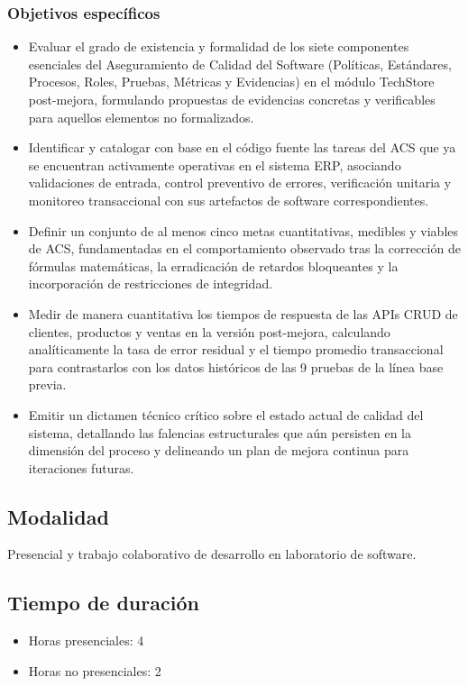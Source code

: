\documentclass{article}
\begin{document}
\subsubsection{Objetivos específicos}
\begin{itemize}
    \item Evaluar el grado de existencia y formalidad de los siete componentes esenciales del Aseguramiento de Calidad del Software (Políticas, Estándares, Procesos, Roles, Pruebas, Métricas y Evidencias) en el módulo TechStore post-mejora, formulando propuestas de evidencias concretas y verificables para aquellos elementos no formalizados.
    \item Identificar y catalogar con base en el código fuente las tareas del ACS que ya se encuentran activamente operativas en el sistema ERP, asociando validaciones de entrada, control preventivo de errores, verificación unitaria y monitoreo transaccional con sus artefactos de software correspondientes.
    \item Definir un conjunto de al menos cinco metas cuantitativas, medibles y viables de ACS, fundamentadas en el comportamiento observado tras la corrección de fórmulas matemáticas, la erradicación de retardos bloqueantes y la incorporación de restricciones de integridad.
    \item Medir de manera cuantitativa los tiempos de respuesta de las APIs CRUD de clientes, productos y ventas en la versión post-mejora, calculando analíticamente la tasa de error residual y el tiempo promedio transaccional para contrastarlos con los datos históricos de las 9 pruebas de la línea base previa.
    \item Emitir un dictamen técnico crítico sobre el estado actual de calidad del sistema, detallando las falencias estructurales que aún persisten en la dimensión del proceso y delineando un plan de mejora continua para iteraciones futuras.
\end{itemize}

\subsection{Modalidad}
Presencial y trabajo colaborativo de desarrollo en laboratorio de software.

\subsection{Tiempo de duración}
\begin{itemize}
    \item Horas presenciales: 4
    \item Horas no presenciales: 2
\end{itemize}
\end{document}
